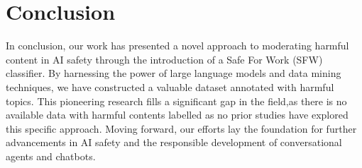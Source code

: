 \documentclass[preprint]{article}
\begin{document}
\section{Conclusion}

In conclusion, our work has presented a novel approach to moderating harmful content in AI safety through the introduction of a Safe For Work (SFW) classifier. By harnessing the power of large language models and data mining techniques, we have constructed a valuable dataset annotated with harmful topics. This pioneering research fills a significant gap in the field,as there is no available data with harmful contents labelled as no prior studies have explored this specific approach. Moving forward, our efforts lay the foundation for further advancements in AI safety and the responsible development of conversational agents and chatbots.

{}

\end{document}
